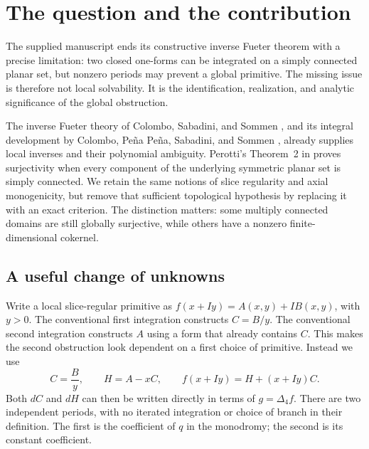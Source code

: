 \documentclass[11pt,a4paper]{article}
\numberwithin{equation}{section}
\theoremstyle{definition}
\theoremstyle{remark}
\newcommand{\lap}{\Delta_4}
\begin{document}
\section{The question and the contribution}
\label{sec:introduction}

The supplied manuscript \cite{Source} ends its constructive inverse Fueter
theorem with a precise limitation: two closed one-forms can be integrated on a
simply connected planar set, but nonzero periods may prevent a global
primitive. The missing issue is therefore not local solvability. It is the
identification, realization, and analytic significance of the global
obstruction.

The inverse Fueter theory of Colombo, Sabadini, and Sommen \cite{CSS}, and its
integral development by Colombo, Pe\~na Pe\~na, Sabadini, and Sommen
\cite{CPSS}, already supplies local inverses and their polynomial ambiguity.
Perotti's Theorem~2 in \cite{Perotti} proves surjectivity when every component of
the underlying symmetric planar set is simply connected. We retain the same
notions of slice regularity and axial monogenicity, but remove that sufficient
topological hypothesis by replacing it with an exact criterion. The distinction
matters: some multiply connected domains are still globally surjective, while
others have a nonzero finite-dimensional cokernel.

\subsection{A useful change of unknowns}
Write a local slice-regular primitive as $f(x+Iy)=A(x,y)+IB(x,y)$, with $y>0$.
The conventional first integration constructs $C=B/y$. The conventional second
integration constructs $A$ using a form that already contains $C$. This makes
the second obstruction look dependent on a first choice of primitive. Instead
we use
\begin{equation}\label{eq:change-unknowns}
 C=\frac{B}{y},\qquad H=A-xC,\qquad f(x+Iy)=H+(x+Iy)C.
\end{equation}
Both $dC$ and $dH$ can then be written directly in terms of $g=\lap f$.
There are two independent periods, with no iterated integration or choice of
branch in their definition. The first is the coefficient of $q$ in the
monodromy; the second is its constant coefficient.
\end{document}
